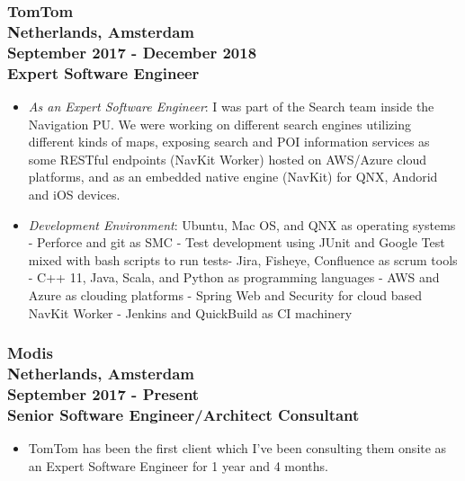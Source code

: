 \documentclass[10pt,a4paper]{article}
\begin{document}
\subsubsection{{\large TomTom} \\ 
\textnormal{Netherlands, Amsterdam} \\ 
\textnormal{September 2017 - December 2018} \\ 
{Expert Software Engineer}}
  \setlength{\leftskip}{0.5cm}
  \setlength{\rightskip}{1cm}
  \begin{itemize}
    \setlength{\rightskip}{1cm}
    \setlength\itemsep{0em}
    \item \textit {As an Expert Software Engineer}: I was part of the Search team inside the Navigation PU. We were working on different search engines utilizing different kinds of maps, exposing search and POI information services as some RESTful endpoints (NavKit Worker) hosted on AWS/Azure cloud platforms, and as an embedded native engine (NavKit) for QNX, Andorid and iOS devices.
    \item \textit {Development Environment}: Ubuntu, Mac OS, and QNX as operating systems - Perforce and git as SMC - Test development using JUnit and Google Test mixed with bash scripts to run tests- Jira, Fisheye, Confluence as scrum tools - C++ 11, Java, Scala, and Python as programming languages - AWS and Azure as clouding platforms - Spring Web and Security for cloud based NavKit Worker - Jenkins and QuickBuild as CI machinery
  \end{itemize}
  \setlength{\leftskip}{0pt}
  \setlength{\rightskip}{0cm}

\subsubsection{{\large Modis} \\ 
\textnormal{Netherlands, Amsterdam} \\ 
\textnormal{September 2017 - Present} \\ 
{Senior Software Engineer/Architect Consultant}}
  \setlength{\leftskip}{0.5cm}
  \setlength{\rightskip}{1cm}
  \begin{itemize}
    \setlength{\rightskip}{1cm}
    \setlength\itemsep{0em}
    \item TomTom has been the first client which I've been consulting them onsite as an Expert Software Engineer for 1 year and 4 months.
  \end{itemize}
  \setlength{\leftskip}{0pt}
  \setlength{\rightskip}{0cm}
  
\end{document}
